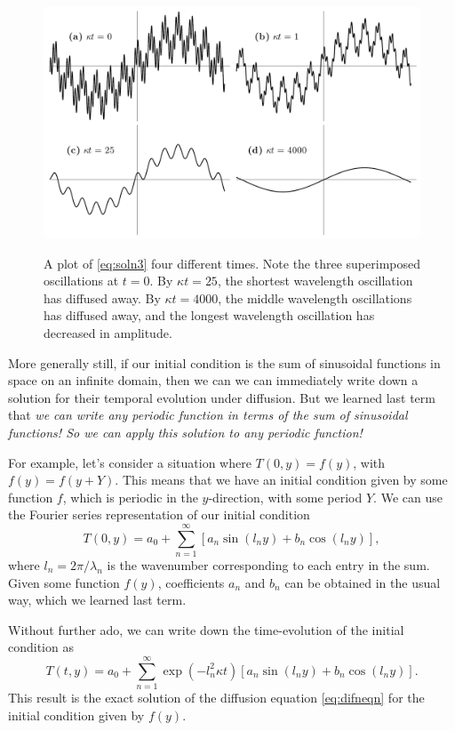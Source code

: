 \documentclass[11pt,twoside,a4paper]{article}
\begin{document}
\begin{figure}[ht]
  \centering
  \includegraphics[height=3in]{../figs/L18/decayThreeOscillations}
  \caption{A plot of \autoref{eq:soln3} four different times. Note the
    three superimposed oscillations at $t=0$.  By $\kappa t=25$, the
    shortest wavelength oscillation has diffused away. By
    $\kappa t=4000$, the middle wavelength oscillations has diffused
    away, and the longest wavelength oscillation has decreased in
    amplitude.}
  \label{fig:threeDecays}
\end{figure}

More generally still, if our initial condition is the sum of
sinusoidal functions in space on an infinite domain, then we can we
can immediately write down a solution for their temporal evolution
under diffusion.  But we learned last term that \textit{we can write
  any periodic function in terms of the sum of sinusoidal functions!
  So we can apply this solution to any periodic function!}

For example, let's consider a situation where $T(0,y) = f(y)$, with
$f(y) = f(y+Y)$.  This means that we have an initial condition given
by some function $f$, which is periodic in the $y$-direction, with
some period $Y$.  We can use the Fourier series representation of our
initial condition
\begin{equation}
  \label{eq:ICfourier}
  T(0,y) = a_0 + \sum_{n=1}^\infty\left[a_n\sin(l_n y) + b_n\cos(l_n y)\right],
\end{equation}
where $l_n=2\pi/\lambda_n$ is the wavenumber corresponding to each
entry in the sum.  Given some function $f(y)$, coefficients $a_n$ and
$b_n$ can be obtained in the usual way, which we learned last term.

Without further ado, we can write down the time-evolution of the
initial condition as
\begin{equation}
  \label{eq:solnfourier}
  T(t,y) = a_0 + \sum_{n=1}^\infty
  \exp\left(-l_n^2\kappa t\right)\left[a_n\sin(l_n y) + 
    b_n\cos(l_n y)\right].
\end{equation}
This result is the exact solution of the diffusion equation
\eqref{eq:difneqn} for the initial condition given by $f(y)$.
\end{document}
